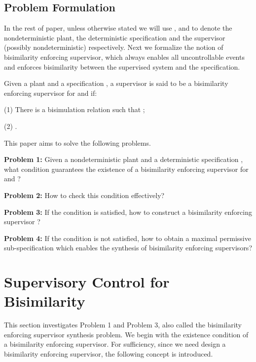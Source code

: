 \documentclass[preprint,authoryear,12pt]{elsarticle}
\begin{document}
\subsection{Problem Formulation}
In the rest of paper, unless otherwise stated we will use , 
and  to denote the
nondeterministic plant, the deterministic specification and the
supervisor (possibly nondeterministic) respectively. Next we
formalize the notion of bisimilarity enforcing supervisor, which
always enables all uncontrollable events and enforces bisimilarity
between the supervised system and the specification.



\begin{Definition}\label{bissup}
Given a plant  and a specification , a supervisor  is
said to be a bisimilarity enforcing supervisor for  and  if:

(1) There is a bisimulation relation  such that ;

(2) .

\end{Definition}


This paper aims to solve the following problems.

{\bf Problem 1:} Given a nondeterministic plant  and a
deterministic specification , what condition guarantees the
existence of a bisimilarity enforcing supervisor  for  and
?

{\bf Problem 2:} How to check this condition effectively?

{\bf Problem 3:} If the condition is satisfied, how to construct a
bisimilarity enforcing supervisor ?

{\bf Problem 4:} If the condition is not satisfied, how to obtain
a maximal permissive sub-specification which enables the synthesis
of bisimilarity enforcing supervisors?






\section{ Supervisory Control for Bisimilarity}





This section investigates Problem 1 and Problem 3, also called the
bisimilarity enforcing supervisor synthesis problem. We begin with
the existence condition of a bisimilarity enforcing supervisor.
For sufficiency, since we need design a bisimilarity enforcing
supervisor, the following concept is introduced.
\end{document}
